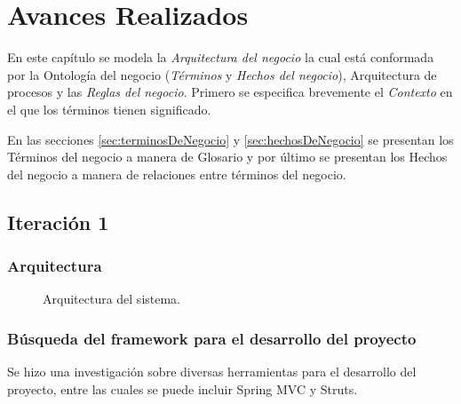 \chapter{Avances Realizados}	
\label{cap:reqSist}

	En este capítulo se modela la {\em Arquitectura del negocio} la cual está conformada por la Ontología del negocio ({\em Términos} y {\em Hechos del negocio}), Arquitectura de procesos y las {\em Reglas del negocio}. Primero se especifica brevemente el {\em Contexto} en el que los términos tienen significado.
	
	En las secciones \ref{sec:terminosDeNegocio} y \ref{sec:hechosDeNegocio} se presentan los Términos del negocio a manera de Glosario y por último se presentan los Hechos del negocio a manera de relaciones entre términos del negocio.

\section{Iteración 1}
\subsection{Arquitectura}


\begin{figure}[htbp!]
	\begin{center}
		\caption{Arquitectura del sistema.}
		\label{fig:Arquitectura}
	\end{center}
\end{figure}
\subsection{Búsqueda del framework para el desarrollo del proyecto} 
Se hizo una investigación sobre diversas herramientas para el desarrollo del proyecto, entre las cuales se puede incluir Spring MVC y Struts. 

